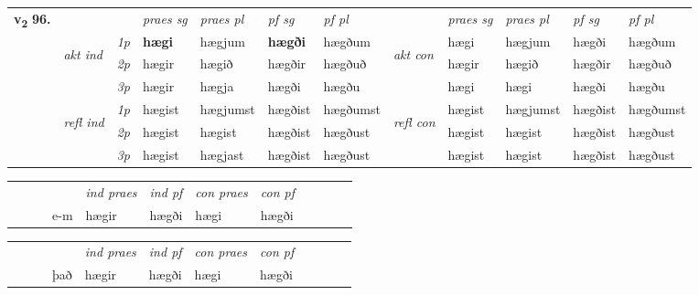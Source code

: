 \begin{tabular}{llllllllllll} \toprule
\multirow{4}{*}{{{\textbf{v{\textsubscript{2}}} \Large{\textbf{96.}}}}}  & &   &  \textit{praes sg}  & \textit{praes pl}  &\textit{ pf sg} & \textit{pf pl} &  &  \textit{praes sg}  & \textit{praes pl}  & \textit{pf sg} & \textit{pf pl } \\*
	\cmidrule{4-7} \cmidrule{9-12}
 & \multirow{3}{*}{\begin{turn}{90}\textit{akt ind}\end{turn}} & {\textit{1p}} & \textbf{hægi} & hægjum    & \textbf{hægði} & hægðum & \multirow{3}{*}{\begin{turn}{90}\textit{akt con}\end{turn}} &hægi & hægjum & hægði & hægðum\\*
& &  {\textit{2p}} &  hægir  & hægið   & hægðir & hægðuð & & hægir & hægið & hægðir & hægðuð \\*
& &  {\textit{3p}} & hægir & hægja   & hægði & hægðu & & hægi & hægi& hægði & hægðu  \\*
\cmidrule{4-7} \cmidrule{9-12}
 &\multirow{3}{*}{\begin{turn}{90}\textit{refl ind}\end{turn}} & {\textit{1p}} & hægist & hægjumst    & hægðist & hægðumst & \multirow{3}{*}{\begin{turn}{90}\textit{refl con}\end{turn}}  &hægist & hægjumst & hægðist & hægðumst\\*
 &&  {\textit{2p}} &  hægist  & hægist   & hægðist & hægðust & &hægist & hægist & hægðist & hægðust \\*
& &  {\textit{3p}} & hægist & hægjast   & hægðist & hægðust & & hægist & hægist& hægðist & hægðust  \\*
\cmidrule{4-7} \cmidrule{9-12}
\end{tabular}


\begin{tabular}{llllllllllll}
 & &  & &  \textit{ind praes} & \textit{ind pf} & \textit{con praes} & \textit{con pf} \\*
&  & & e-m & hægir & hægði & hægi & hægði \\*
\cmidrule{5-9}
\end{tabular}


\begin{tabular}{llllllllllll}
 & &  & &  \textit{ind praes} & \textit{ind pf} & \textit{con praes} & \textit{con pf} \\*
&  & & það & hægir & hægði & hægi & hægði \\*
\cmidrule{5-9}
\end{tabular}



